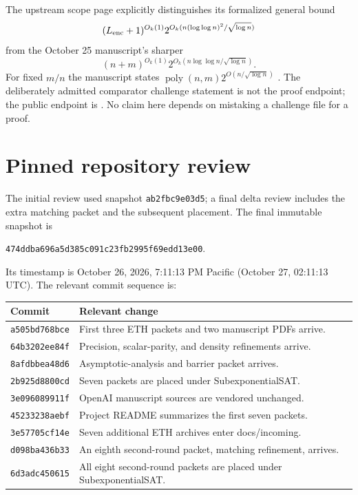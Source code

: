 \documentclass[11pt,letterpaper]{article}
\theoremstyle{definition}\newtheorem{definition}[theorem]{Definition}
\theoremstyle{remark}\newtheorem{remark}[theorem]{Remark}
\newcommand{\poly}{\operatorname{poly}}
\begin{document}
The upstream scope page explicitly distinguishes its formalized general
bound
\[
 (L_{\rm enc}+1)^{O_k(1)}
 2^{O_k(n(\log\log n)^2/\sqrt{\log n})}
\]
from the October 25 manuscript's sharper
\[
 (n+m)^{O_k(1)}2^{O_k(n\log\log n/\sqrt{\log n})}.
\]
For fixed $m/n$ the manuscript states
$\poly(n,m)2^{O(n/\sqrt{\log n})}$ \cite{leanscope}.
The deliberately admitted comparator challenge statement is not the
proof endpoint; the public endpoint is
.
No claim here depends on mistaking a challenge file for a proof.

\section{Pinned repository review}
\label{sec:review}

The initial review used snapshot \texttt{ab2fbc9e03d5}; a final delta
review includes the extra matching packet and the subsequent placement.
The final immutable snapshot is
\begin{center}
\texttt{474ddba696a5d385c091c23fb2995f69edd13e00}.
\end{center}
Its timestamp is October 26, 2026, 7:11:13 PM Pacific
(October 27, 02:11:13 UTC). The relevant commit sequence is:
\begin{center}
\small
\begin{tabular}{@{}lp{}@{}}
\toprule
Commit & Relevant change\\
\midrule
\texttt{a505bd768bce} & First three ETH packets and two manuscript PDFs arrive.\\
\texttt{64b3202ee84f} & Precision, scalar-parity, and density refinements arrive.\\
\texttt{8afdbbea48d6} & Asymptotic-analysis and barrier packet arrives.\\
\texttt{2b925d8800cd} & Seven packets are placed under SubexponentialSAT.\\
\texttt{3e096089911f} & OpenAI manuscript sources are vendored unchanged.\\
\texttt{45233238aebf} & Project README summarizes the first seven packets.\\
\texttt{3e57705cf14e} & Seven additional ETH archives enter docs/incoming.\\
\texttt{d098ba436b33} & An eighth second-round packet, matching refinement, arrives.\\
\texttt{6d3adc450615} & All eight second-round packets are placed under SubexponentialSAT.\\
\bottomrule
\end{tabular}
\end{center}
\end{document}
